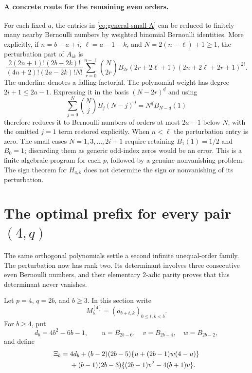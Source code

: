 \documentclass[11pt,a4paper]{article}
\numberwithin{equation}{section}
\theoremstyle{plain}
\theoremstyle{definition}
\theoremstyle{remark}
\begin{document}
\paragraph{A concrete route for the remaining even orders.}
For each fixed $a$, the entries in \eqref{eq:general-small-A} can be
reduced to finitely many nearby Bernoulli numbers by weighted
binomial Bernoulli identities.  More explicitly, if
$n=b-a+i$, $\ell=a-1-k$, and $N=2(n-\ell)+1\geq1$, the perturbation
part of $A_{ik}$ is
\[
 \frac{2(2n+1)!(2b-2k)!}
 {(4n+2)!(2a-2k)!N!}
 \sum_{r=0}^{n-\ell}\binom N{2r}B_{2r}
 (2r+2\ell+1)
 (2n+2\ell+2r+1)^{\underline{2i}}.
\]
The underline denotes a falling factorial.  The polynomial weight
has degree $2i+1\leq2a-1$.  Expressing it in the basis
$(N-2r)^{\underline d}$ and using
\[
 \sum_{j=0}^N\binom Nj B_j(N-j)^{\underline d}
   =N^{\underline d}B_{N-d}(1)
\]
therefore reduces it to Bernoulli numbers of orders at most $2a-1$
below $N$, with the omitted $j=1$ term restored explicitly.
When $n<\ell$ the perturbation entry is zero.  The small cases
$N=1,3,\ldots,2i+1$ require retaining $B_1(1)=1/2$ and $B_0=1$;
discarding them as generic odd-index zeros would be an error.
This is a finite algebraic program for each $p$, followed by a
genuine nonvanishing problem.  The sign theorem for $H_{a,b}$
does not determine the sign or nonvanishing of its perturbation.




\section{The optimal prefix for every pair \texorpdfstring{$(4,q)$}{(4,q)}}
\label{rf:section}

The same orthogonal polynomials settle a second infinite unequal-order
family.  The perturbation now has rank two.  Its determinant involves
three consecutive even Bernoulli numbers, and their elementary
$2$-adic parity proves that this determinant never vanishes.

Let $p=4$, $q=2b$, and $b\geq3$.  In this section write
\[
 M_b^{[4]}=(a_{b+t,k})_{0\leq t,k<b}.
\]
For $b\geq4$, put
\[
 d_b=4b^2-6b-1,\qquad
 u=B_{2b-6},\quad v=B_{2b-4},\quad w=B_{2b-2},
\]
and define
\begin{align}
 \Xi_b={}&4d_b
 +(b-2)(2b-5)\{u+(2b-1)w(4-u)\}\notag\\
 &+(b-1)(2b-3)\{(2b-1)v^2-4(b+1)v\}.
 \label{rf:Xi}
\end{align}
\end{document}

